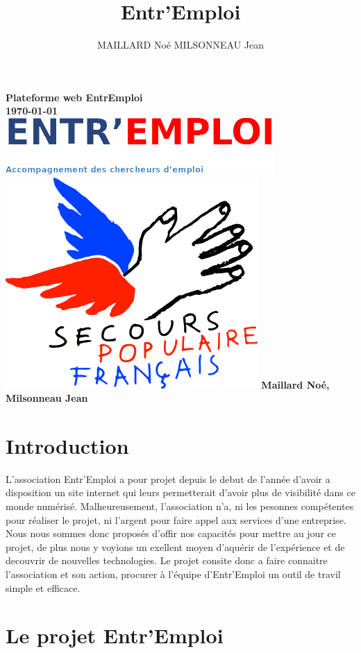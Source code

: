 \documentclass[a4paper, 12pt]{report}
\title{Entr'Emploi}
\author{MAILLARD Noé MILSONNEAU Jean}
\begin{document}
\begin{titlepage}
	\thispagestyle{empty}
    \centering
    {\bfseries\Large
    		Plateforme web EntrEmploi\\
        \today\\
        \vskip3cm
        \includegraphics{../../public/images/Logo-entremploi-md.png}
        \vskip15mm
        \includegraphics{../../public/images/Logo-spf.png}
        \vskip3cm
        Maillard Noé, Milsonneau Jean\\
    }
    \normalsize
\end{titlepage}

\tableofcontents
\newpage
\chapter*{Introduction}
\thispagestyle{fancy}
L'association Entr'Emploi a pour projet depuis le debut de l'année d'avoir a disposition un site internet qui leurs permetterait d'avoir plus de visibilité
dans ce monde numérisé. Malheureusement, l'association n'a, ni les pesonnes compétentes pour réaliser le projet, ni l'argent pour faire appel aux services d'une entreprise.
Nous nous sommes donc proposés d'offir nos capacités pour mettre au jour ce projet, de plus nous y voyions un exellent moyen d'aquérir de l'expérience et de decouvrir de nouvelles technologies.
Le projet consite donc a faire connaitre l'association et son action, procurer à l'équipe d'Entr'Emploi un outil de travil simple et efficace.

\chapter{Le projet Entr'Emploi}
\thispagestyle{fancy}
\end{document}
